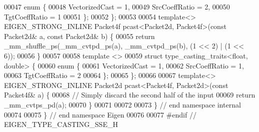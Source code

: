 \begin{DoxyCode}
00047   \textcolor{keyword}{enum} \{
00048     VectorizedCast = 1,
00049     SrcCoeffRatio = 2,
00050     TgtCoeffRatio = 1
00051   \};
00052 \};
00053 
00054 \textcolor{keyword}{template}<> EIGEN\_STRONG\_INLINE Packet4f pcast<Packet2d, Packet4f>(\textcolor{keyword}{const} Packet2d& a, \textcolor{keyword}{const} Packet2d& b) \{
00055   \textcolor{keywordflow}{return} \_mm\_shuffle\_ps(\_mm\_cvtpd\_ps(a), \_mm\_cvtpd\_ps(b), (1 << 2) | (1 << 6));
00056 \}
00057 
00058 \textcolor{keyword}{template} <>
00059 \textcolor{keyword}{struct }type\_casting\_traits<float, double> \{
00060   \textcolor{keyword}{enum} \{
00061     VectorizedCast = 1,
00062     SrcCoeffRatio = 1,
00063     TgtCoeffRatio = 2
00064   \};
00065 \};
00066 
00067 \textcolor{keyword}{template}<> EIGEN\_STRONG\_INLINE Packet2d pcast<Packet4f, Packet2d>(\textcolor{keyword}{const} Packet4f& a) \{
00068   \textcolor{comment}{// Simply discard the second half of the input}
00069   \textcolor{keywordflow}{return} \_mm\_cvtps\_pd(a);
00070 \}
00071 
00072 
00073 \} \textcolor{comment}{// end namespace internal}
00074 
00075 \} \textcolor{comment}{// end namespace Eigen}
00076 
00077 \textcolor{preprocessor}{#endif // EIGEN\_TYPE\_CASTING\_SSE\_H}
\end{DoxyCode}
